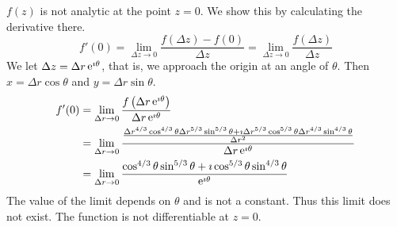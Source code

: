 {\begin{Solution}
  $f(z)$ is not analytic at the point $z = 0$.  We show this by calculating
  the derivative there.
  \[
  f'(0) = \lim_{\Delta z \to 0} \frac{f(\Delta z) - f(0)}{\Delta z}
  = \lim_{\Delta z \to 0} \frac{f(\Delta z)}{\Delta z}
  \]
  We let $\Delta z = \Delta r \mathop{\mathrm{e}}\nolimits^{\imath \theta}$, that is, we approach the origin
  at an angle of $\theta$.  Then $x = \Delta r \cos \theta$ and
  $y = \Delta r \sin \theta$.
  \begin{align*}
    f'(0)   &= \lim_{\Delta r \to 0} \frac{ f\left( \Delta r \mathop{\mathrm{e}}\nolimits^{\imath \theta} \right)}
    {\Delta r \mathop{\mathrm{e}}\nolimits^{\imath \theta} } 
    \\
    &= \lim_{\Delta r \to 0} \frac{
      \frac{ \Delta r^{4/3} \cos^{4/3} \theta  \Delta r^{5/3} \sin^{5/3} \theta
        + \imath  \Delta r^{5/3} \cos^{5/3} \theta  \Delta r^{4/3} \sin^{4/3} \theta}{\Delta r^2} }
    {\Delta r \mathop{\mathrm{e}}\nolimits^{\imath \theta} } 
    \\
    &= \lim_{\Delta r \to 0} 
    \frac{ \cos^{4/3} \theta \sin^{5/3} \theta + \imath \cos^{5/3} \theta \sin^{4/3} \theta }{\mathop{\mathrm{e}}\nolimits^{\imath \theta} } 
  \end{align*}
  The value of the limit depends on $\theta$ and
  is not a constant.  Thus this limit does not exist.  The function is 
  not differentiable at $z = 0$.
\end{Solution}







}
